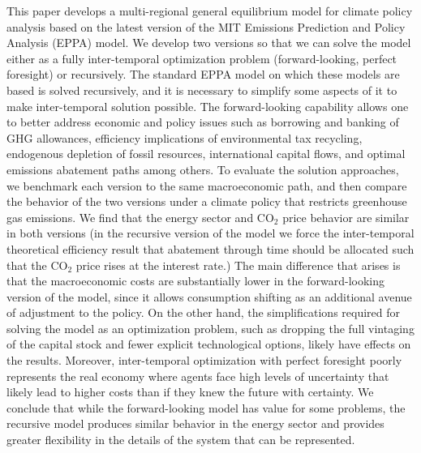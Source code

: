 This paper develops a multi-regional general equilibrium model for climate policy analysis based on the latest version of the MIT Emissions Prediction and Policy Analysis (EPPA) model. We develop two versions so that we can solve the model either as a fully inter-temporal optimization problem (forward-looking, perfect foresight) or recursively. The standard EPPA model on which these models are based is solved recursively, and it is necessary to simplify some aspects of it to make inter-temporal solution possible. The forward-looking capability allows one to better address economic and policy issues such as borrowing and banking of GHG allowances, efficiency implications of environmental tax recycling, endogenous depletion of fossil resources, international capital flows, and optimal emissions abatement paths among others. To evaluate the solution approaches, we benchmark each version to the same macroeconomic path, and then compare the behavior of the two versions under a climate policy that restricts greenhouse gas emissions. We find that the energy sector and CO$_2$ price behavior are similar in both versions (in the recursive version of the model we force the inter-temporal theoretical efficiency result that abatement through time should be allocated such that the CO$_2$ price rises at the interest rate.) The main difference that arises is that the macroeconomic costs are substantially lower in the forward-looking version of the model, since it allows consumption shifting as an additional avenue of adjustment to the policy. On the other hand, the simplifications required for solving the model as an optimization problem, such as dropping the full vintaging of the capital stock and fewer explicit technological options, likely have effects on the results. Moreover, inter-temporal optimization with perfect foresight poorly represents the real economy where agents face high levels of uncertainty that likely lead to higher costs than if they knew the future with certainty. We conclude that while the forward-looking model has value for some problems, the recursive model produces similar behavior in the energy sector and provides greater flexibility in the details of the system that can be represented.

